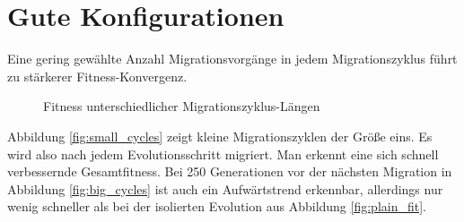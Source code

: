 \documentclass[12pt,a4paper]{article}
\begin{document}
\section{Gute Konfigurationen}
Eine gering gewählte Anzahl Migrationsvorgänge in jedem Migrationszyklus führt zu stärkerer Fitness-Konvergenz.
\begin{figure}
\centering
{}
\caption{Fitness unterschiedlicher Migrationszyklus-Längen}
\end{figure}
Abbildung \ref{fig:small_cycles} zeigt kleine Migrationszyklen der Größe eins. Es wird also nach jedem Evolutionsschritt migriert. Man erkennt eine sich schnell verbessernde Gesamtfitness. Bei 250 Generationen vor der nächsten Migration in Abbildung \ref{fig:big_cycles} ist auch ein Aufwärtstrend erkennbar, allerdings nur wenig schneller als bei der isolierten Evolution aus Abbildung \ref{fig:plain_fit}.
\end{document}
